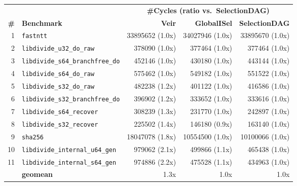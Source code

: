     \centering
    \footnotesize
    \begin{tabular}{r l r r r }
        \toprule
        & & \multicolumn{3}{c}{\textbf{\#Cycles (ratio vs.\ SelectionDAG)}} \\
        \cmidrule(lr){3-5}
        \textbf{\#} & \textbf{Benchmark} & \textbf{Veir} & \textbf{GlobalISel} & \textbf{SelectionDAG} \\
        \midrule
        1 & \texttt{fastntt} & 33895652 (1.0x) & 34027946 (1.0x) & 33895670 (1.0x) \\
        2 & \texttt{libdivide\_u32\_do\_raw} & 378090 (1.0x) & 377464 (1.0x) & 377464 (1.0x) \\
        3 & \texttt{libdivide\_s64\_branchfree\_do} & 452146 (1.0x) & 430180 (1.0x) & 443144 (1.0x) \\
        4 & \texttt{libdivide\_s64\_do\_raw} & 575462 (1.0x) & 549182 (1.0x) & 551522 (1.0x) \\
        5 & \texttt{libdivide\_s32\_do\_raw} & 482238 (1.2x) & 401122 (1.0x) & 416586 (1.0x) \\
        6 & \texttt{libdivide\_s32\_branchfree\_do} & 396902 (1.2x) & 333652 (1.0x) & 333616 (1.0x) \\
        7 & \texttt{libdivide\_s64\_recover} & 308239 (1.3x) & 231770 (1.0x) & 242897 (1.0x) \\
        8 & \texttt{libdivide\_s32\_recover} & 225502 (1.4x) & 146180 (0.9x) & 163140 (1.0x) \\
        9 & \texttt{sha256} & 18047078 (1.8x) & 10554500 (1.0x) & 10100066 (1.0x) \\
        10 & \texttt{libdivide\_internal\_u64\_gen} & 979062 (2.1x) & 499866 (1.1x) & 465438 (1.0x) \\
        11 & \texttt{libdivide\_internal\_s64\_gen} & 974886 (2.2x) & 475528 (1.1x) & 434963 (1.0x) \\
        \midrule
        & \textbf{geomean} & 1.3x & 1.0x & 1.0x \\
        \bottomrule
    \end{tabular}
    \label{cycles_ratio_table_real}